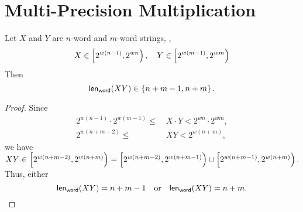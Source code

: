 \newpage
\section{Multi-Precision Multiplication}
\begin{note} Let $X$ and $Y$ are $n$-word and $m$-word strings, \ie, \[
X\in\intco{2^{w(n-1)},2^{wn}},\quad
Y\in\intco{2^{w(m-1)},2^{wm}}
\] Then
\[\mathsf{len}_{\mathsf{word}}(XY)\in\set{n+m-1, n+m}.
\]
\begin{proof}
	Since \begin{align*}
		2^{w(n-1)}\cdot 2^{w(m-1)}\leq&\ X\cdot Y<2^{wn}\cdot 2^{wm},\\
		2^{w(n+m-2)}\leq&\ XY<2^{w(n+m)},
	\end{align*} we have $XY\in\intco{2^{w(n+m-2)}, 2^{w(n+m)}}=\intco{2^{w(n+m-2)}, 2^{w(n+m-1)}}\cup\intco{2^{w(n+m-1)}, 2^{w(n+m)}}$. Thus, either \[
	\mathsf{len}_{\mathsf{word}}(XY)=n+m-1\quad\text{or}\quad\mathsf{len}_{\mathsf{word}}(XY)=n+m.
	\]
\end{proof}
\end{note}

